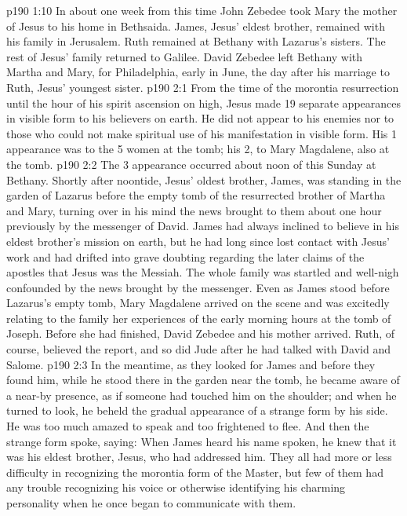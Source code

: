 \vs p190 1:10 In about one week from this time John Zebedee took Mary the mother of Jesus to his home in Bethsaida. James, Jesus’ eldest brother, remained with his family in Jerusalem. Ruth remained at Bethany with Lazarus’s sisters. The rest of Jesus’ family returned to Galilee. David Zebedee left Bethany with Martha and Mary, for Philadelphia, early in June, the day after his marriage to Ruth, Jesus’ youngest sister.
\vs p190 2:1 From the time of the morontia resurrection until the hour of his spirit ascension on high, Jesus made 19 separate appearances in visible form to his believers on earth. He did not appear to his enemies nor to those who could not make spiritual use of his manifestation in visible form. His 1 appearance was to the 5 women at the tomb; his 2, to Mary Magdalene, also at the tomb.
\vs p190 2:2 The 3 appearance occurred about noon of this Sunday at Bethany. Shortly after noontide, Jesus’ oldest brother, James, was standing in the garden of Lazarus before the empty tomb of the resurrected brother of Martha and Mary, turning over in his mind the news brought to them about one hour previously by the messenger of David. James had always inclined to believe in his eldest brother’s mission on earth, but he had long since lost contact with Jesus’ work and had drifted into grave doubting regarding the later claims of the apostles that Jesus was the Messiah. The whole family was startled and well\hyp{}nigh confounded by the news brought by the messenger. Even as James stood before Lazarus’s empty tomb, Mary Magdalene arrived on the scene and was excitedly relating to the family her experiences of the early morning hours at the tomb of Joseph. Before she had finished, David Zebedee and his mother arrived. Ruth, of course, believed the report, and so did Jude after he had talked with David and Salome.
\vs p190 2:3 In the meantime, as they looked for James and before they found him, while he stood there in the garden near the tomb, he became aware of a near\hyp{}by presence, as if someone had touched him on the shoulder; and when he turned to look, he beheld the gradual appearance of a strange form by his side. He was too much amazed to speak and too frightened to flee. And then the strange form spoke, saying:  When James heard his name spoken, he knew that it was his eldest brother, Jesus, who had addressed him. They all had more or less difficulty in recognizing the morontia form of the Master, but few of them had any trouble recognizing his voice or otherwise identifying his charming personality when he once began to communicate with them.
